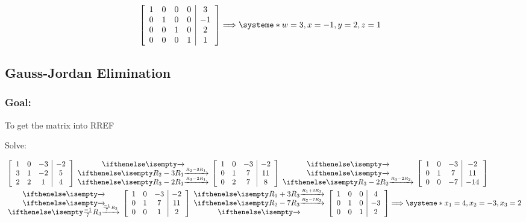 \documentclass[
  letterpaper,
  DIV=11,
  numbers=noendperiod]{scrartcl}
\begin{document}
\begin{align*}
&\left[\begin{array}{cccc|c}1 & 0 & 0 & 0 & 3 \\ 0 & 1 & 0 & 0 & -1 \\ 0 & 0 & 1 & 0 & 2 \\ 0 & 0 & 0 & 1 & 1 \end{array}\right] \Longrightarrow \systeme*{w=3, x=-1, y=2, z=1}
\end{align*}

\newpage{}

\hypertarget{gauss-jordan-elimination}{%
\subsection{Gauss-Jordan Elimination}\label{gauss-jordan-elimination}}

\hypertarget{goal-1}{%
\subsubsection{Goal:}\label{goal-1}}

To get the matrix into RREF

Solve: 

\begin{align*}
&\left[\begin{array}{ccc|c}1 & 0 & -3 & -2 \\ 3 & 1 & -2 & 5 \\ 2 & 2 & 1 & 4\end{array}\right]\rowops{,R_2-3R_1,R_3-2R_1}\left[\begin{array}{ccc|c}1 & 0 & -3 & -2 \\ 0 & 1 & 7 & 11 \\ 0 & 2 & 7 & 8\end{array}\right]\rowops{,,R_3-2R_2}\left[\begin{array}{ccc|c}1 & 0 & -3 & -2 \\ 0 & 1 & 7 & 11 \\ 0 & 0 & -7 & -14\end{array}\right]\\
&\rowops{,,\frac{-1}{7}R_3}\left[\begin{array}{ccc|c}1 & 0 & -3 & -2 \\ 0 & 1 & 7 & 11 \\ 0 & 0 & 1 & 2\end{array}\right]\rowops{R_1+3R_3,R_2-7R_3,}\left[\begin{array}{ccc|c}1 & 0 & 0 & 4 \\ 0 & 1 & 0 & -3 \\ 0 & 0 & 1 & 2\end{array}\right] \Longrightarrow \systeme*{x_1=4, x_2=-3, x_3=2}
\end{align*}
\end{document}
